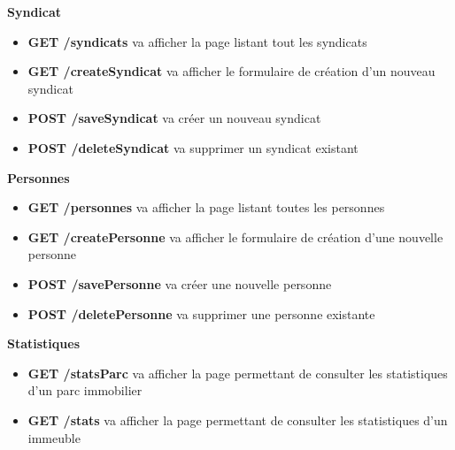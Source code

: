 \documentclass[french]{article}
\begin{document}
\noindent \textbf{Syndicat}
\begin{itemize}
\item \textbf{GET /syndicats} va afficher la page listant tout les syndicats
\item \textbf{GET /createSyndicat} va afficher le formulaire de création d'un nouveau syndicat
\item \textbf{POST /saveSyndicat} va créer un nouveau syndicat
\item \textbf{POST /deleteSyndicat} va supprimer un syndicat existant \\
\end{itemize}

\noindent \textbf{Personnes}
\begin{itemize}
\item \textbf{GET /personnes} va afficher la page listant toutes les personnes
\item \textbf{GET /createPersonne} va afficher le formulaire de création d'une nouvelle personne
\item \textbf{POST /savePersonne} va créer une nouvelle personne
\item \textbf{POST /deletePersonne} va supprimer une personne existante \\
\end{itemize}

\noindent \textbf{Statistiques}
\begin{itemize}
\item \textbf{GET /statsParc} va afficher la page permettant de consulter les statistiques d'un parc immobilier
\item \textbf{GET /stats} va afficher la page permettant de consulter les statistiques d'un immeuble \\
\end{itemize}
\end{document}
